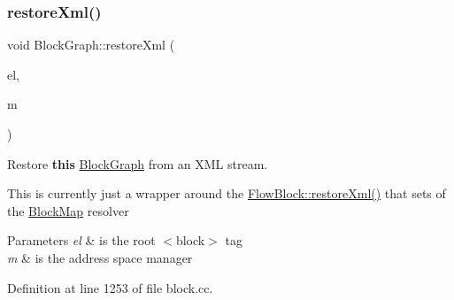 \subsubsection{\texorpdfstring{restoreXml()}{restoreXml()}}
{\footnotesize\ttfamily void Block\+Graph\+::restore\+Xml (\begin{DoxyParamCaption}\item[{const \mbox{\hyperlink{class_element}{Element}} $\ast$}]{el,  }\item[{const \mbox{\hyperlink{class_addr_space_manager}{Addr\+Space\+Manager}} $\ast$}]{m }\end{DoxyParamCaption})}



Restore {\bfseries{this}} \mbox{\hyperlink{class_block_graph}{Block\+Graph}} from an X\+ML stream. 

This is currently just a wrapper around the \mbox{\hyperlink{class_flow_block_a002ddc14dc84098dcb14b513f8b973c1}{Flow\+Block\+::restore\+Xml()}} that sets of the \mbox{\hyperlink{class_block_map}{Block\+Map}} resolver 
\begin{DoxyParams}{Parameters}
{\em el} & is the root $<$block$>$ tag \\
\hline
{\em m} & is the address space manager \\
\hline
\end{DoxyParams}


Definition at line 1253 of file block.\+cc.

